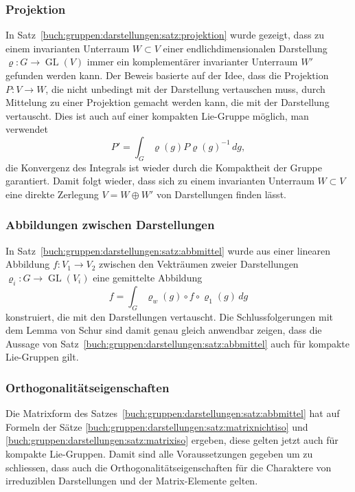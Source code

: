 %
%
\subsubsection{Projektion}
In Satz~\ref{buch:gruppen:darstellungen:satz:projektion} wurde gezeigt,
dass zu einem invarianten Unterraum $W\subset V$ einer endlichdimensionalen
Darstellung $\varrho\colon G\to \operatorname{GL}(V)$ immer ein komplementärer
invarianter Unterraum $W'$ gefunden werden kann.
Der Beweis basierte auf der Idee, dass die Projektion $P\colon V\to W$,
die nicht unbedingt mit der Darstellung vertauschen muss, durch Mittelung
zu einer Projektion gemacht werden kann, die mit der Darstellung vertauscht.
Dies ist auch auf einer kompakten Lie-Gruppe möglich, man verwendet
\[
P'
=
\int_G \varrho(g)P\varrho(g)^{-1}\,dg,
\]
die Konvergenz des Integrals ist wieder durch die Kompaktheit der Gruppe
garantiert.
Damit folgt wieder, dass sich zu einem invarianten Unterraum $W\subset V$
eine direkte Zerlegung $V=W\oplus W'$ von Darstellungen finden lässt.

%
%
\subsubsection{Abbildungen zwischen Darstellungen}
In Satz~\ref{buch:gruppen:darstellungen:satz:abbmittel} wurde aus einer
linearen Abbildung $f\colon V_1\to V_2$ zwischen den Vekträumen zweier
Darstellungen $\varrho_i\colon G\to\operatorname{GL}(V_i)$ eine
gemittelte Abbildung 
\[
f
=
\int_G \varrho_w(g) \circ f \circ \varrho_1(g)\,dg
\]
konstruiert, die mit den Darstellungen vertauscht.
Die Schlussfolgerungen mit dem Lemma von Schur sind damit genau gleich
anwendbar zeigen, dass die Aussage von
Satz~\ref{buch:gruppen:darstellungen:satz:abbmittel} auch für kompakte
Lie-Gruppen gilt.

%
%
\subsubsection{Orthogonalitätseigenschaften}
Die Matrixform des Satzes~\ref{buch:gruppen:darstellungen:satz:abbmittel} 
hat auf Formeln der Sätze 
\ref{buch:gruppen:darstellungen:satz:matrixnichtiso}
und
\ref{buch:gruppen:darstellungen:satz:matrixiso}
ergeben, diese gelten jetzt auch für kompakte Lie-Gruppen.
Damit sind alle Voraussetzungen gegeben um zu schliessen, dass auch
die Orthogonalitätseigenschaften für die Charaktere von irreduziblen
Darstellungen und der Matrix-Elemente gelten.

